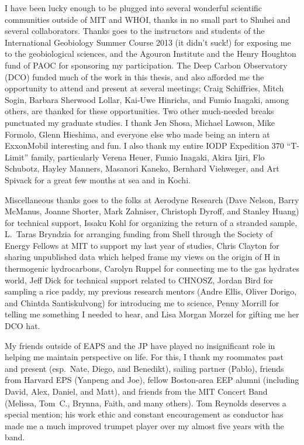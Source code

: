 I have been lucky enough to be plugged into several wonderful scientific
communities outside of MIT and WHOI, thanks in no small part to Shuhei
and several collaborators. Thanks goes to the instructors and students
of the International Geobiology Summer Course 2013 (it didn't suck!) for
exposing me to the geobiological sciences, and the Agouron Institute and
the Henry Houghton fund of PAOC for sponsoring my participation. The
Deep Carbon Observatory (DCO) funded much of the work in this thesis,
and also afforded me the opportunity to attend and present at several
meetings; Craig Schiffries, Mitch Sogin, Barbara Sherwood Lollar,
Kai-Uwe Hinrichs, and Fumio Inagaki, among others, are thanked for these
opportunities. Two other much-needed breaks punctuated my graduate
studies. I thank Jen Shosa, Michael Lawson, Mike Formolo, Glenn
Hieshima, and everyone else who made being an intern at ExxonMobil
interesting and fun. I also thank my entire IODP Expedition 370
``T-Limit'' family, particularly Verena Heuer, Fumio Inagaki, Akira
Ijiri, Flo Schubotz, Hayley Manners, Masanori Kaneko, Bernhard
Viehweger, and Art Spivack for a great few months at sea and in Kochi.

Miscellaneous thanks goes to the folks at Aerodyne Research (Dave
Nelson, Barry McManus, Joanne Shorter, Mark Zahniser, Christoph Dyroff,
and Stanley Huang) for technical support, Issaku Kohl for organizing the
return of a stranded sample, L.~Taras Bryndzia for arranging funding
from Shell through the Society of Energy Fellows at MIT to support my
last year of studies, Chris Clayton for sharing unpublished data which
helped frame my views on the origin of H in thermogenic hydrocarbons,
Carolyn Ruppel for connecting me to the gas hydrates world,
Jeff Dick for technical support related to CHNOSZ,
Jordan Bird for sampling a rice paddy, my previous research mentors 
(Andre Ellis, Oliver Dorigo, and Chintda Santiskulvong) for introducing me to science,
Penny Morrill for telling me something I needed to hear,
and Lisa Morgan Morzel for gifting me her DCO hat.

My friends outside of EAPS and the JP have played no insignificant role
in helping me maintain perspective on life. For this, I thank my
roommates past and present (esp.\ Nate, Diego, and Benedikt), sailing
partner (Pablo), friends from Harvard EPS (Yanpeng and Joe), fellow
Boston-area EEP alumni (including David, Alex, Daniel, and Matt), and
friends from the MIT Concert Band (Melissa, Tom~C., Brynna, Faith, and
many others). Tom Reynolds deserves a special mention; his work ethic
and constant encouragement as conductor has made me a much improved
trumpet player over my almost five years with the band.

